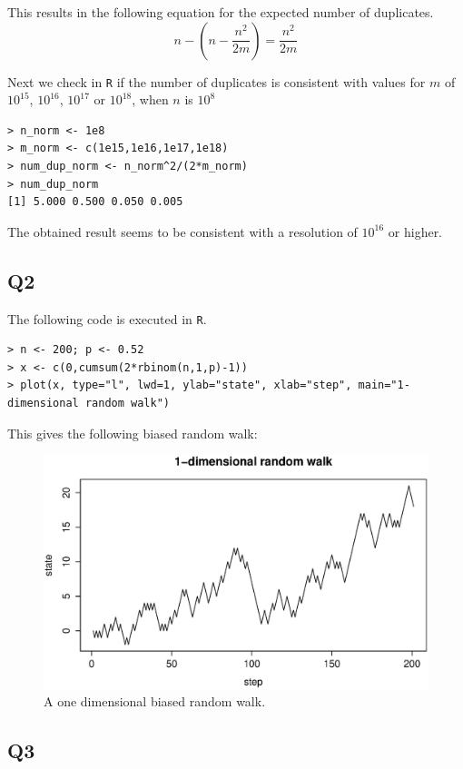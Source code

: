 This results in the following equation for the expected number of duplicates.
\begin{equation}
n - \left(n - \frac{n^2}{2m}\right) = \frac{n^2}{2m}
\end{equation}

Next we check in \verb|R| if the number of duplicates is consistent with values for $m$ of $10^{15}$, $10^{16}$, $10^{17}$ or $10^{18}$, when $n$ is $10^8$
\begin{verbatim}
> n_norm <- 1e8
> m_norm <- c(1e15,1e16,1e17,1e18)
> num_dup_norm <- n_norm^2/(2*m_norm)
> num_dup_norm
[1] 5.000 0.500 0.050 0.005
\end{verbatim}

The obtained result seems to be consistent with a resolution of $10^{16}$ or higher.
 
\subsection*{Q2}
The following code is executed in \verb|R|.
\begin{verbatim}
> n <- 200; p <- 0.52
> x <- c(0,cumsum(2*rbinom(n,1,p)-1))
> plot(x, type="l", lwd=1, ylab="state", xlab="step", main="1-dimensional random walk")
\end{verbatim}
This gives the following biased random walk:

\begin{center}
	\begin{figure}[H]
		\includegraphics[scale=.6]{NL1_Q2_1D-randomwalk.eps} 
		\caption{A one dimensional biased random walk.}
	\end{figure}
\end{center}



\subsection*{Q3}

